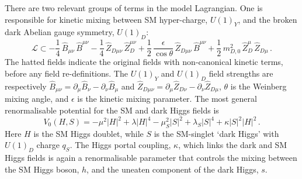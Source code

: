 There are two relevant groups of terms in the model Lagrangian. One is responsible for kinetic mixing between SM hyper-charge, $U(1)_Y$, and the broken dark Abelian gauge symmetry, $U(1)_D$:
%
\begin{equation}\label{eq:KM}
\mathcal{L} \subset -\frac{1}{4} \,\hat B_{\mu\nu}\, \hat B^{\mu\nu} - \frac{1}{4} \,\hat Z_{D\mu\nu}\, \hat Z_D^{\mu\nu}  + \frac{1}{2}\,\frac{\epsilon}{\cos\theta} \,\hat Z_ {D\mu\nu}\,\hat B^{\mu\nu} + \frac{1}{2}\, m_{D,0}^2\, \hat Z_D^\mu \, \hat Z_{D\mu}\, .
\end{equation}
%
The hatted fields indicate the original fields with non-canonical
kinetic terms, before any field re-definitions. 
%
The $U(1)_Y$ and
$U(1)_D$ field strengths are respectively $\hat B_{\mu\nu}
=\partial_\mu \hat B_{\nu} - \partial_\nu \hat B_{\mu}$ and $\hat
Z_{D\mu\nu} =\partial_\mu \hat Z_{D\nu} - \partial_\nu \hat Z_{D\mu}$,
$\theta$ is the Weinberg mixing angle, and $\epsilon$ is the kinetic
mixing parameter.
The most general renormalisable potential for the SM and dark Higgs fields is 
\begin{equation}
\label{eq:HM}
V_0 (H,S) =   -\mu^2|H|^2 +  \lambda |H|^4 -\mu_S^2 |S|^2 + \lambda_S |S|^4 +
   \kappa  |S|^2|H|^2\, .
\end{equation}
Here $H$ is the SM Higgs doublet, while $S$ is the SM-singlet `dark
Higgs' with $U(1)_D$ charge $q_S$.  The Higgs portal coupling, $\kappa$, which links the dark and SM Higgs fields is again a renormalisable parameter that controls the mixing between the SM Higgs boson, $h$, and the uneaten component of the dark Higgs, $s$. 





